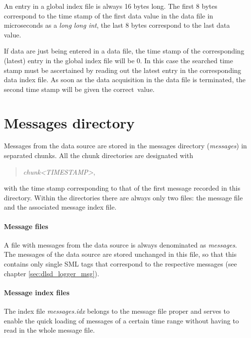 \documentclass[a4paper,12pt,BCOR6mm,bibtotoc,idxtotoc]{scrbook}
\begin{document}
An entry in a global index file is always 16 bytes long. The first 8 bytes correspond to the time stamp of the first data value in the data file in microseconds as a \textit{long long int}, the last 8 bytes correspond to the last data value.

If data are just being entered in a data file, the time stamp of the corresponding (latest) entry in the global index file will be 0. In this case the searched time stamp must be ascertained by reading out the latest entry in the corresponding data index file. As soon as the data acquisition in the data file is terminated, the second time stamp will be given the \glqq correct\grqq\  value.


\section{Messages directory} \label{sec:data_msg}

Messages from the data source are stored in the messages directory (\textit{messages}) in separated chunks. All the chunk directories are designated with

\begin{quote} \textit{chunk\textless TIMESTAMP\textgreater}, \end{quote}

with the time stamp corresponding to that of the first message recorded in this directory. Within the directories there are always only two files: the message file and the associated message index file.

\paragraph{Message files} A file with messages from the data source is always denominated as \textit{messages}. The messages of the data source are stored unchanged in this file, so that this contains only single SML tags that correspond to the respective messages (see chapter \ref{sec:dlsd_logger_msg}).

\paragraph{Message index files} The index file \textit{messages.idx} belongs to the message file proper and serves to enable the quick loading of messages of a certain time range without having to read in the whole message file.
\end{document}
